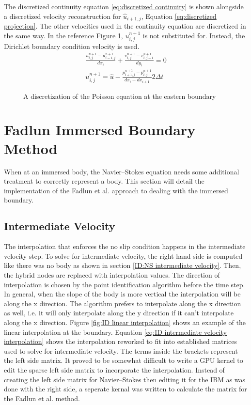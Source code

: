\documentclass[onehalf,11pt]{beavtex}
\begin{document}
The discretized continuity equation \eqref{eq:discretized continuity} is shown alongside a discretized velocity reconstruction for $\hat{u}_{i+1,j}$, Equation \eqref{eq:discretized projection}.
The other velocities used in the continuity equation are discretized in the same way. 
In the reference Figure \ref{fig:ID poisson}, $u_{i,j}^{n+1}$ is not substituted for.
Instead, the Dirichlet boundary condition velocity is used.
\begin{align}
\frac{u_{i,j}^{n+1} - u_{i-1,j}^{n+1}}{dx_i} + \frac{v_{i,j}^{n+1} - v_{i,j-1}^{n+1}}{dy_i} = 0 \label{eq:discretized continuity} \\
u_{i,j}^{n+1} = \hat{u} - \frac{p_{i+1,j}^{n+1} - p_{i,j}^{n+1}}{dx_i + dx_{i+1}}2\Delta t \; \label{eq:discretized projection}
\end{align}
\begin{figure}
	\centering
	
	\caption{A discretization of the Poisson equation at the eastern boundary}
	\label{fig:ID poisson}
\end{figure}

\section{Fadlun Immersed Boundary Method}
When at an immersed body, the Navier--Stokes equation needs some additional treatment to correctly represent a body. 
This section will detail the implementation of the Fadlun et al. approach to dealing with the immersed boundary.
\subsection{Intermediate Velocity}
The interpolation that enforces the no slip condition happens in the intermediate velocity step. 
To solve for intermediate velocity, the right hand side is computed like there was no body as shown in section \ref{ID:NS intermediate velocity}.
Then, the hybrid nodes are replaced with interpolation values.
The direction of interpolation is chosen by the point identification algorithm before the time step.
In general, when the slope of the body is more vertical the interpolation will be along the x direction.
The algorithm prefers to interpolate along the x direction as well, i.e. it will only interpolate along the y direction if it can't interpolate along the x direction.
Figure \ref{fig:ID linear interpolation} shows an example of the linear interpolation at the boundary.
Equation \eqref{eq:ID intermediate velocity interpolation} shows the interpolation reworked to fit into established matrices used to solve for intermediate velocity.
The terms inside the brackets represent the left side matrix.
It proved to be somewhat difficult to write a GPU kernel to edit the sparse left side matrix to incorporate the interpolation.
Instead of creating the left side matrix for Navier--Stokes then editing it for the IBM as was done with the right side, a seperate kernal was written to calculate the matrix for the Fadlun et al. method.
\end{document}
